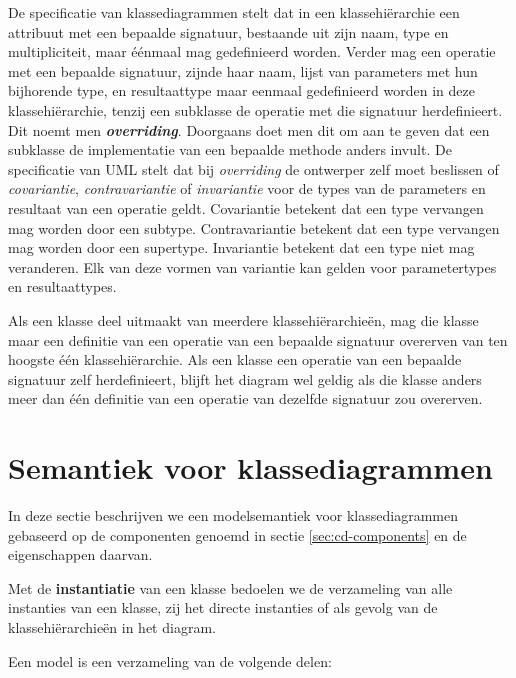 De specificatie van klassediagrammen stelt dat in een klassehi\"erarchie een attribuut met een bepaalde signatuur, bestaande uit zijn naam, type en multipliciteit, maar \'e\'enmaal mag gedefinieerd worden. Verder mag een operatie met een bepaalde signatuur, zijnde haar naam, lijst van parameters met hun bijhorende type, en resultaattype maar eenmaal gedefinieerd worden in deze klassehi\"erarchie, tenzij een subklasse de operatie met die signatuur herdefinieert. Dit noemt men \textit{\textbf{overriding}}. Doorgaans doet men dit om aan te geven dat een subklasse de implementatie van een bepaalde methode anders invult. De specificatie van UML\cite{OMG-UML} stelt dat bij \textit{overriding} de ontwerper zelf moet beslissen of \textit{covariantie}, \textit{contravariantie} of \textit{invariantie} voor de types van de parameters en resultaat van een operatie geldt. Covariantie betekent dat een type vervangen mag worden door een subtype. Contravariantie betekent dat een type vervangen mag worden door een supertype. Invariantie betekent dat een type niet mag veranderen. Elk van deze vormen van variantie kan gelden voor parametertypes en resultaattypes.

Als een klasse deel uitmaakt van meerdere klassehi\"erarchie\"en, mag die klasse maar een definitie van een operatie van een bepaalde signatuur overerven van ten hoogste \'e\'en klassehi\"erarchie. Als een klasse een operatie van een bepaalde signatuur zelf herdefinieert, blijft het diagram wel geldig als die klasse anders meer dan \'e\'en definitie van een operatie van dezelfde signatuur zou overerven.

\section{Semantiek voor klassediagrammen}

In deze sectie beschrijven we een modelsemantiek voor klassediagrammen gebaseerd op de componenten genoemd in sectie \ref{sec:cd-components} en de eigenschappen daarvan.

Met de \textbf{instantiatie} van een klasse bedoelen we de verzameling van alle instanties van een klasse, zij het directe instanties of als gevolg van de klassehi\"erarchie\"en in het diagram.

Een model is een verzameling van de volgende delen:

